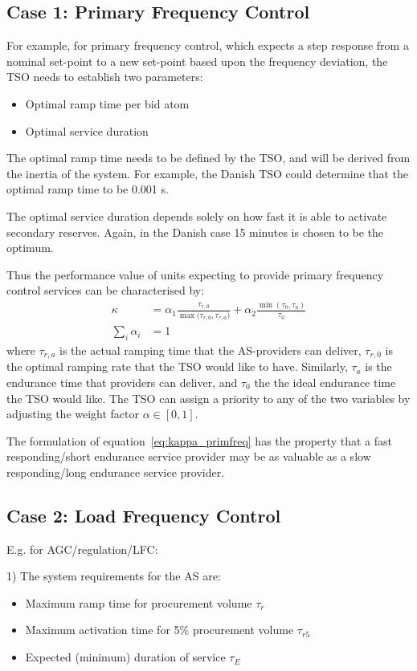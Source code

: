 
\subsection{Case 1: Primary Frequency Control}
For example, for primary frequency control, which expects a step response from a nominal set-point to a new set-point based upon the frequency deviation, the TSO needs to establish two parameters:
\begin{itemize}
\item Optimal ramp time per bid atom
\item Optimal service duration
\end{itemize}

The optimal ramp time needs to be defined by the TSO, and will be derived from the inertia of the system. For example, the Danish TSO could determine that the optimal ramp time to be 0.001 s.

The optimal service duration depends solely on how fast it is able to activate secondary reserves. Again, in the Danish case 15 minutes is chosen to be the optimum.

Thus the performance value of units expecting to provide primary frequency control services can be characterised by:
\begin{align}
\kappa &= \alpha_1 \frac{\tau_{r,0}}{\max({\tau_{r,0},\tau_{r,a})}} + \alpha_2  \frac{\min(\tau_0,\tau_{a})}{\tau_{0}}\label{eq:kappa_primfreq}\\
\sum_{i} \alpha_i &= 1
\end{align}
where $\tau_{r,a}$ is the actual ramping time that the AS-providers can deliver, $\tau_{r,0}$ is the optimal ramping rate that the TSO would like to have. Similarly, $\tau_a$ is the endurance time that providers can deliver, and $\tau_{0}$ the the ideal endurance time the TSO would like. 
The TSO can assign a priority to any of the two variables by adjusting the weight factor $\alpha \in [0,1]$.

The formulation of equation~\eqref{eq:kappa_primfreq} has the property that a fast responding/short endurance service provider may be as valuable as a slow responding/long endurance service provider. 

\subsection{Case 2: Load Frequency Control}

E.g. for AGC/regulation/LFC:

1) The system requirements for the AS are: 
\begin{itemize}
\item Maximum ramp time for procurement volume $\tau_r$
\item Maximum activation time for 5\% procurement volume $\tau_{r5}$
\item Expected (minimum) duration of service $\tau_E$
\end{itemize}

